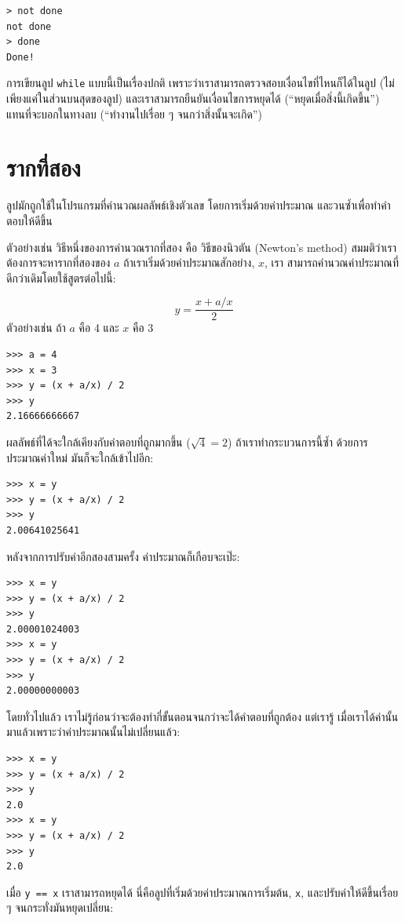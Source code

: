 \begin{verbatim}
> not done
not done
> done
Done!
\end{verbatim}
% 
การเขียนลูป {\tt while} แบบนี้เป็นเรื่องปกติ 
เพราะว่าเราสามารถตรวจสอบเงื่อนไขที่ไหนก็ได้ในลูป (ไม่เพียงแค่ในส่วนบนสุดของลูป) และเราสามารถยืนยันเงื่อนไขการหยุดได้
(``หยุดเมื่อสิ่งนี้เกิดขึ้น'') แทนที่จะบอกในทางลบ (``ทำงานไปเรื่อย ๆ จนกว่าสิ่งนั้นจะเกิด'')


\section{รากที่สอง} %
\label{squareroot}

ลูปมักถูกใช้ในโปรแกรมที่คำนวณผลลัพธ์เชิงตัวเลข โดยการเริ่มด้วยค่าประมาณ
และวนซ้ำเพื่อทำคำตอบให้ดีขึ้น

ตัวอย่างเช่น วิธีหนึ่งของการคำนวณรากที่สอง คือ วิธีของนิวตัน (Newton's method)
สมมติว่าเราต้องการจะหารากที่สองของ {\scriptsize$a$} ถ้าเราเริ่มด้วยค่าประมาณสักอย่าง, {\scriptsize$x$}, เรา
สามารถคำนวณค่าประมาณที่ดีกว่าเดิมโดยใช้สูตรต่อไปนี้:

\[ y = \frac{x + a/x}{2} \]
%
ตัวอย่างเช่น ถ้า {\scriptsize$a$} คือ 4 และ {\scriptsize$x$} คือ 3

\begin{verbatim}
>>> a = 4
>>> x = 3
>>> y = (x + a/x) / 2
>>> y
2.16666666667
\end{verbatim}
%
ผลลัพธ์ที่ได้จะใกล้เคียงกับคำตอบที่ถูกมากขึ้น ({\scriptsize$\sqrt{4} = 2$}) ถ้าเราทำกระบวนการนี้ซ้ำ
ด้วยการประมาณค่าใหม่ มันก็จะใกล้เข้าไปอีก:

\begin{verbatim}
>>> x = y
>>> y = (x + a/x) / 2
>>> y
2.00641025641
\end{verbatim}
%
หลังจากการปรับค่าอีกสองสามครั้ง ค่าประมาณก็เกือบจะเป๊ะ:

\begin{verbatim}
>>> x = y
>>> y = (x + a/x) / 2
>>> y
2.00001024003
>>> x = y
>>> y = (x + a/x) / 2
>>> y
2.00000000003
\end{verbatim}
%
โดยทั่วไปแล้ว เราไม่รู้ก่อนว่าจะต้องทำกี่ขั้นตอนจนกว่าจะได้คำตอบที่ถูกต้อง แต่เรารู้
เมื่อเราได้ค่านั้นมาแล้วเพราะว่าค่าประมาณนั้นไม่เปลี่ยนแล้ว:

\begin{verbatim}
>>> x = y
>>> y = (x + a/x) / 2
>>> y
2.0
>>> x = y
>>> y = (x + a/x) / 2
>>> y
2.0
\end{verbatim}
%
เมื่อ {\tt y == x} เราสามารถหยุดได้ นี่คือลูปที่เริ่มด้วยค่าประมาณการเริ่มต้น, {\tt x},
และปรับค่าให้ดีขึ้นเรื่อย ๆ จนกระทั่งมันหยุดเปลี่ยน:

